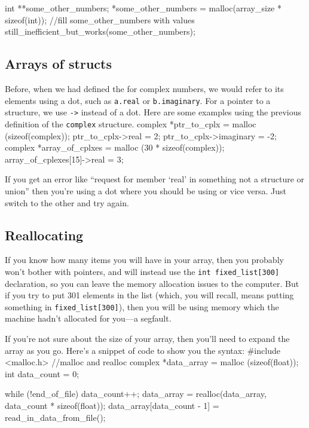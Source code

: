 \documentclass[12pt]{article}
\makeatletter
\def\ttind#1{\index{#1@{\tt #1}}{\tt #1}}
\makeatother
\begin{document}
int **some_other_numbers;
*some_other_numbers = malloc(array_size * sizeof(int));
//fill some_other_numbers with values
still_inefficient_but_works(some_other_numbers);

\subsection{Arrays of structs}	
Before, when we had defined the \ttind{struct} for complex numbers, we would refer to its elements using a
dot, such as {\tt a.real} or {\tt b.imaginary}. For a pointer to a structure, we use {\tt ->} instead of 
a dot.  Here are some examples using the previous definition of the {\tt complex} structure.
complex *ptr_to_cplx = malloc (sizeof(complex));
ptr_to_cplx->real = 2;
ptr_to_cplx->imaginary = -2;
complex *array_of_cplxes = malloc (30 * sizeof(complex));
array_of_cplexes[15]->real = 3;

If you get an error like ``request for member `real' in something not a structure or union'' then you're
using a dot where you should be using \ttind{->} or vice versa. Just switch to the other and try again.


\subsection{Reallocating} If you know how many items you will have
in your array, then you probably won't bother with pointers, and will
instead use the {\tt int fixed\_list[300]} declaration, so you can leave
the memory allocation issues to the computer. But if you try to put 301
elements in the list (which, you will recall, means putting something
in {\tt fixed\_list[300]}), then you will be using memory which the
machine hadn't
allocated for you---a segfault.

If you're not sure about the size of your array, then you'll need to
expand the array as you go. Here's a snippet of code to show you the syntax:
#include <malloc.h>     //malloc and realloc
complex *data_array = malloc (sizeof(float));
int data_count = 0;

while (!end_of_file){
    data_count++;
    data_array = realloc(data_array, data_count * sizeof(float));
    data_array[data_count - 1] = read_in_data_from_file();
}
\end{document}
